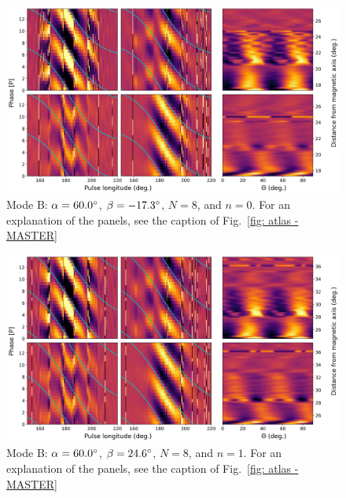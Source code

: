 \begin{figure}
	\begin{center}
		\includegraphics[width=\atlasHeightFrac\textwidth]{Figures/B0031/atlas/B_517060008000_plots}
		\caption[Atlas results: Mode B -- $\alpha=60.0\degr$, $\beta=-17.3\degr$, $N=8$, $n=0$]{Mode B: $\alpha=60.0\degr$, $\beta=-17.3\degr$, $N=8$, and $n=0$. For an explanation of the panels, see the caption of Fig.~\ref{fig: atlas - MASTER} }
		\label{fig: atlas - B_517060008000}
	\end{center}
\end{figure}

\begin{figure}
	\begin{center}
		\includegraphics[width=\atlasHeightFrac\textwidth]{Figures/B0031/atlas/B_517060008001_plots}
		\caption[Atlas results: Mode B -- $\alpha=60.0\degr$, $\beta=24.6\degr$, $N=8$, $n=1$]{Mode B: $\alpha=60.0\degr$, $\beta=24.6\degr$, $N=8$, and $n=1$. For an explanation of the panels, see the caption of Fig.~\ref{fig: atlas - MASTER} }
		\label{fig: atlas - B_517060008001}
	\end{center}
\end{figure}


